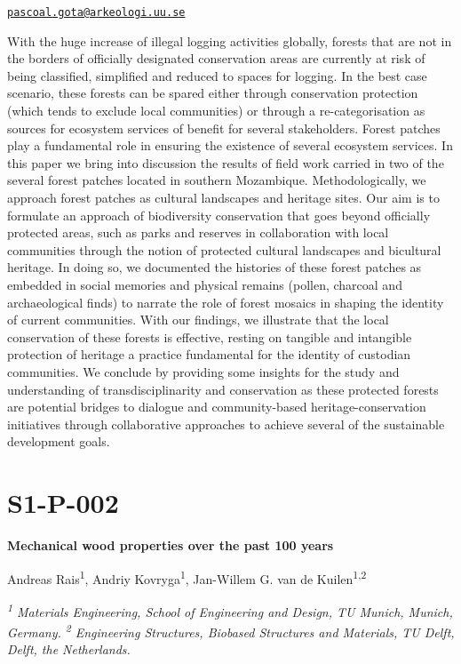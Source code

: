 \documentclass[
]{book}
\begin{document}
\href{mailto:pascoal.gota@arkeologi.uu.se}{\nolinkurl{pascoal.gota@arkeologi.uu.se}}

With the huge increase of illegal logging activities globally, forests that are not in the borders of officially designated conservation areas are currently at risk of being classified, simplified and reduced to spaces for logging. In the best case scenario, these forests can be spared either through conservation protection (which tends to exclude local communities) or through a re-categorisation as sources for ecosystem services of benefit for several stakeholders. Forest patches play a fundamental role in ensuring the existence of several ecosystem services. In this paper we bring into discussion the results of field work carried in two of the several forest patches located in southern Mozambique. Methodologically, we approach forest patches as cultural landscapes and heritage sites. Our aim is to formulate an approach of biodiversity conservation that goes beyond officially protected areas, such as parks and reserves in collaboration with local communities through the notion of protected cultural landscapes and bicultural heritage. In doing so, we documented the histories of these forest patches as embedded in social memories and physical remains (pollen, charcoal and archaeological finds) to narrate the role of forest mosaics in shaping the identity of current communities. With our findings, we illustrate that the local conservation of these forests is effective, resting on tangible and intangible protection of heritage a practice fundamental for the identity of custodian communities. We conclude by providing some insights for the study and understanding of transdisciplinarity and conservation as these protected forests are potential bridges to dialogue and community-based heritage-conservation initiatives through collaborative approaches to achieve several of the sustainable development goals.

\hypertarget{s1-p-002}{%
\section*{S1-P-002}\label{s1-p-002}}

\textbf{Mechanical wood properties over the past 100 years}

Andreas Rais\textsuperscript{1}, Andriy Kovryga\textsuperscript{1}, Jan-Willem G. van de Kuilen\textsuperscript{1,2}

\emph{\textsuperscript{1} Materials Engineering, School of Engineering and Design, TU Munich, Munich, Germany. \textsuperscript{2} Engineering Structures, Biobased Structures and Materials, TU Delft, Delft, the Netherlands.}
\end{document}
